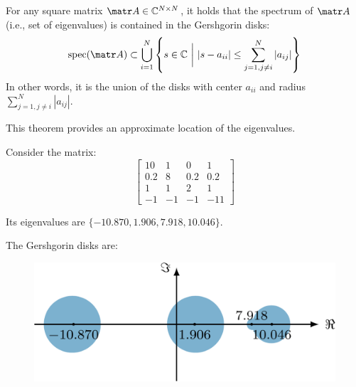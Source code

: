 \begin{theorem}[Gershgorin] \label{th:gershgorin} 
    For any square matrix $\A \in \mathbb{C}^{N \times N}$, it holds that the spectrum of $\A$ (i.e., set of eigenvalues) is contained in the Gershgorin disks:
    \[
        \text{spec}(\A) \subset \bigcup_{i=1}^{N} \left\{ s \in \mathbb{C} \,\,\bigg|\,\, |s - a_{ii}| \leq \sum_{j=1, j \neq i}^{N} |a_{ij}| \right\}
    \]
    In other words, it is the union of the disks with center $a_{ii}$ and radius $\sum_{j=1, j \neq i}^{N} |a_{ij}|$.

    \indenttbox
    \begin{remark}
        This theorem provides an approximate location of the eigenvalues.
    \end{remark}

    \indenttbox
    \begin{example}
        Consider the matrix:
        \[
            \begin{bmatrix}
                10 & 1 & 0 & 1 \\
                0.2 & 8 & 0.2 & 0.2 \\
                1 & 1 & 2 & 1 \\
                -1 & -1 & -1 & -11
            \end{bmatrix}
        \]

        Its eigenvalues are $\{ -10.870, 1.906, 7.918, 10.046 \}$.

        The Gershgorin disks are:
        \begin{figure}[H]
            \centering
            \includegraphics[width=0.4\linewidth]{./img/gershgorin.png}
        \end{figure}
    \end{example}
\end{theorem}



